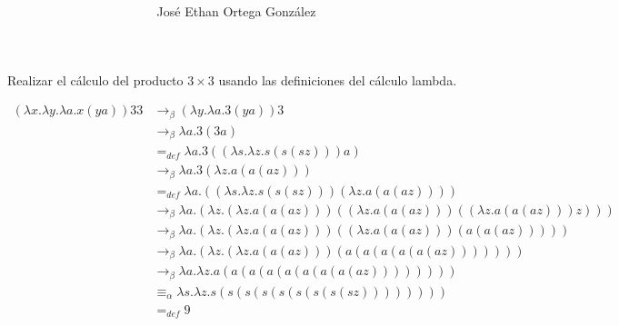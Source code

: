 \documentclass[answers]{exam}
\title{
  \huge \materia{} \\[0.5cm]
  \LARGE \tarea{} }
\author{José Ethan Ortega González}
\begin{document}
\maketitle{}
\thispagestyle{headandfoot}
\begin{questions}
  \question[1] Realizar el cálculo del producto $3 \times 3$ usando las definiciones
  del cálculo lambda.
  \begin{solution}
    \begin{align*}
      (\lambda x.\lambda y.\lambda a.x(ya))33
      &\to_{\beta} (\lambda y.\lambda a.3(ya))3 \\
      &\to_{\beta} \lambda a.3(3a) \\
      &=_{def} \lambda a.3((\lambda s.\lambda z.s(s(sz)))a) \\
      &\to_{\beta} \lambda a.3(\lambda z.a(a(az))) \\
      &=_{def} \lambda a.((\lambda s.\lambda z.s(s(sz)))(\lambda z.a(a(az)))) \\
      &\to_{\beta} \lambda a.(\lambda z.(\lambda z.a(a(az)))((\lambda z.a(a(az)))((\lambda z.a(a(az)))z))) \\
      &\to_{\beta} \lambda a.(\lambda z.(\lambda z.a(a(az)))((\lambda z.a(a(az)))(a(a(az))))) \\
      &\to_{\beta} \lambda a.(\lambda z.(\lambda z.a(a(az)))(a(a(a(a(a(az))))))) \\
      &\to_{\beta} \lambda a.\lambda z.a(a(a(a(a(a(a(a(az)))))))) \\
      &\equiv_{\alpha} \lambda s.\lambda z.s(s(s(s(s(s(s(s(sz)))))))) \\
      &=_{def} 9
    \end{align*}
  \end{solution}


\end{questions}
\end{document}
